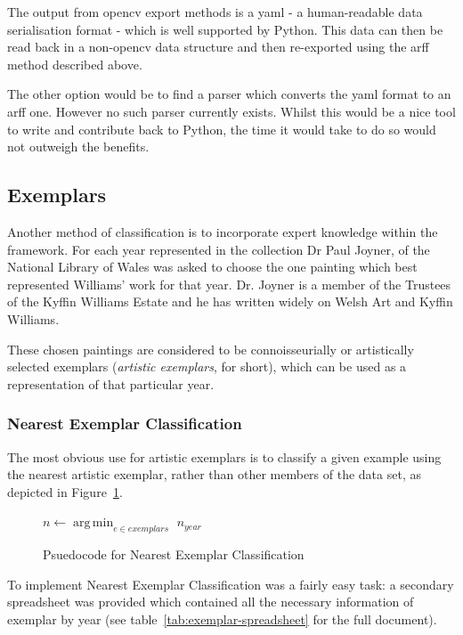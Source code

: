 The output from \gls{opencv} export methods is a \gls{yaml} - a human-readable data serialisation
format - which is well supported by Python. This data can then be read back in a non-\gls{opencv}
data structure and then re-exported using the \gls{arff} method described above.

The other option would be to find a parser which converts the \gls{yaml} format to an \gls{arff} 
one. However no such parser currently exists. Whilst this would be a nice tool to write and
contribute back to Python, the time it would take to do so would not outweigh the benefits.


\subsection{Exemplars}
Another method of classification is to incorporate expert knowledge within the framework. For each
year represented in the collection Dr Paul Joyner, of the National Library of Wales was asked to
choose the one painting which best represented Williams' work for that year. Dr. Joyner is a 
member of the Trustees of the Kyffin Williams Estate and he has written widely on Welsh Art and
Kyffin Williams.

These chosen paintings are considered to be connoisseurially or artistically selected exemplars
(\emph{artistic exemplars}, for short), which can be used as a representation of that particular
year.


\subsubsection{Nearest Exemplar Classification}
The most obvious use for artistic exemplars is to classify a given example using the nearest 
artistic exemplar, rather than other members of the data set, as depicted in 
Figure~\ref{fig:nearest-exemplar}.

\begin{figure}[h]
\begin{algorithmic}
\State $n \gets \operatorname*{arg\,min}_{e \in exemplars}$ 
\State \Return $n_{year}$
\EndFunction
\end{algorithmic}
\caption{Psuedocode for Nearest Exemplar Classification}\label{fig:nearest-exemplar}
\end{figure}

To implement Nearest Exemplar Classification was a fairly easy task: a secondary spreadsheet was 
provided which contained all the necessary information of exemplar by year (see 
table~\ref{tab:exemplar-spreadsheet} for the full document).

